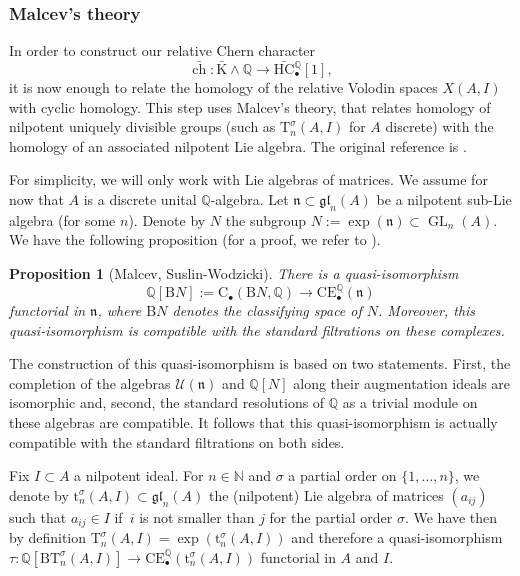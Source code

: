 \documentclass[JEP,XML,SOM,Unicode,NoEqCountersInSection]{cedram}
\let\mathcal\mathscr
\let\widebar\bar
\newcommand{\sbullet}{{\scriptscriptstyle\bullet}}
\newtheorem{prop}[thm]{Proposition}
\theoremstyle{definition}
\newcommand{\N}{\mathbb{N}}
\newcommand{\Q}{\mathbb{Q}}
\newcommand{\B}{\mathrm{B}}
\newcommand{\gl}{\mathfrak{gl}}
\newcommand{\bch}{\widebar{\operatorname{ch}}}
\newcommand{\GL}{\operatorname{GL}}
\newcommand{\bK}{\widebar{\mathrm{K}}}
\newcommand{\bHC}{\widebar{\mathrm{HC}}{}}
\newcommand{\CE}{\mathrm{CE}}
\newcommand{\n}{\mathfrak n}
\begin{document}
\subsubsection{Malcev's theory}
In order to construct our relative Chern character
\[
\bch \colon \bK \wedge \Q \to \bHC_\sbullet^\Q[1],
\]
it is now enough to relate the homology of the relative Volodin spaces $X(A,I)$ with cyclic homology.
This step uses Malcev's theory, that relates homology of nilpotent uniquely divisible groups (such as $\mathrm{T}^\sigma_n(A,I)$ for $A$ discrete) with the homology of an associated nilpotent Lie algebra.
The original reference is \cite{malcev:lie}.

For simplicity, we will only work with Lie algebras of matrices. We assume for now that $A$ is a discrete unital $\Q$-algebra. Let $\n \subset \gl_n(A)$ be a nilpotent sub-Lie algebra (for some $n$). Denote by $N$ the subgroup $N := \exp(\n) \subset \GL_n(A)$.
We have the following proposition (for a proof,
we refer to \cite[Th.\,5.11]{suslinwodzicki}).
\begin{prop}[Malcev, Suslin-Wodzicki]\label{prop:malcev}
There is a quasi-isomorphism
\[
\Q[\B N] := \mathrm C_\sbullet(\B N, \Q) \to \CE_\sbullet^\Q(\n)
\]
functorial in $\n$, where $\B N$ denotes the classifying space of $N$.
Moreover, this quasi-isomorphism is compatible with the standard filtrations on these complexes.
\end{prop}
The construction of this quasi-isomorphism is based on two statements. First, the completion of the algebras $\mathcal U(\n)$ and $\Q[N]$ along their augmentation ideals are isomorphic and, second, the standard resolutions of $\Q$ as a trivial module on these algebras are compatible.
It follows that this quasi-isomorphism is actually compatible with the standard filtrations on both sides.

Fix $I \subset A$ a nilpotent ideal. For $n \in \N$ and $\sigma$ a partial order on $\{1, \dots, n\}$, we denote by $\mathrm{t}^\sigma_n(A,I) \subset \gl_n(A)$ the (nilpotent) Lie algebra of matrices $(a_{ij})$ such that $a_{ij} \in I$ if~$i$ is not smaller than $j$ for the partial order $\sigma$.
We have then by definition $\mathrm{T}^\sigma_n(A,I) = \exp(\mathrm{t}^\sigma_n(A,I))$ and therefore a quasi-isomorphism
$\tau \colon \Q[\B \mathrm{T}^\sigma_n(A,I)] \to \CE_\sbullet^\Q(\mathrm{t}^\sigma_n(A,I))$ functorial in $A$ and $I$.
\end{document}
